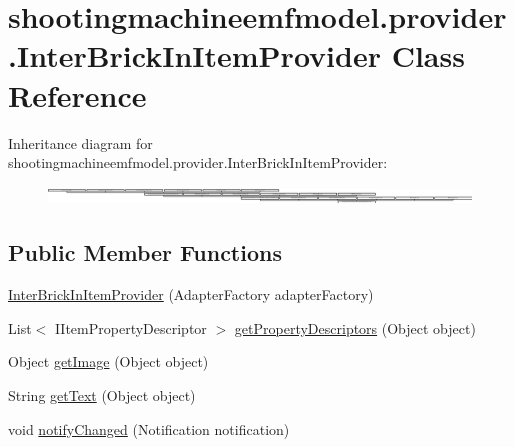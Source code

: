 \hypertarget{classshootingmachineemfmodel_1_1provider_1_1_inter_brick_in_item_provider}{\section{shootingmachineemfmodel.\-provider.\-Inter\-Brick\-In\-Item\-Provider Class Reference}
\label{classshootingmachineemfmodel_1_1provider_1_1_inter_brick_in_item_provider}
}
Inheritance diagram for shootingmachineemfmodel.\-provider.\-Inter\-Brick\-In\-Item\-Provider\-:\begin{figure}[H]
\begin{center}
\leavevmode
\includegraphics[height=0.470292cm]{classshootingmachineemfmodel_1_1provider_1_1_inter_brick_in_item_provider}
\end{center}
\end{figure}
\subsection*{Public Member Functions}
\begin{DoxyCompactItemize}
\item 
\hyperlink{classshootingmachineemfmodel_1_1provider_1_1_inter_brick_in_item_provider_a5ece71d2a29b149055aa8d253500f4d6}{Inter\-Brick\-In\-Item\-Provider} (Adapter\-Factory adapter\-Factory)
\item 
List$<$ I\-Item\-Property\-Descriptor $>$ \hyperlink{classshootingmachineemfmodel_1_1provider_1_1_inter_brick_in_item_provider_a12aa18b8ae24052dd79214fd09b3a62b}{get\-Property\-Descriptors} (Object object)
\item 
Object \hyperlink{classshootingmachineemfmodel_1_1provider_1_1_inter_brick_in_item_provider_afe484455492f7de163e4c0f71a7e302a}{get\-Image} (Object object)
\item 
String \hyperlink{classshootingmachineemfmodel_1_1provider_1_1_inter_brick_in_item_provider_a00e5bbdcb76af6a2a88b093df92054b2}{get\-Text} (Object object)
\item 
void \hyperlink{classshootingmachineemfmodel_1_1provider_1_1_inter_brick_in_item_provider_a1535baced8ed1e31b50d6931a6683e00}{notify\-Changed} (Notification notification)
\end{DoxyCompactItemize}
